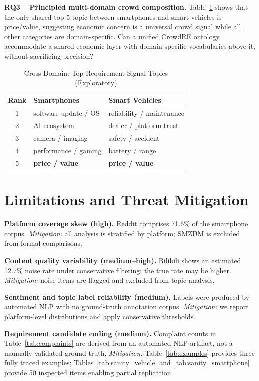 \documentclass[conference]{IEEEtran}
\begin{document}
\textbf{RQ3 -- Principled multi-domain crowd composition.} Table~\ref{tab:crossdomain} shows that the only shared top-5 topic between smartphones and smart vehicles is price/value, suggesting economic concern is a universal crowd signal while all other categories are domain-specific. Can a unified CrowdRE ontology accommodate a shared economic layer with domain-specific vocabularies above it, without sacrificing precision?

\begin{table}[htb]
\caption{Cross-Domain: Top Requirement Signal Topics (Exploratory)}
\label{tab:crossdomain}
\centering\small
\begin{tabular}{cll}
\toprule
Rank & Smartphones & Smart Vehicles \\
\midrule
1 & software update / OS      & reliability / maintenance \\
2 & AI ecosystem              & dealer / platform trust \\
3 & camera / imaging          & safety / accident \\
4 & performance / gaming      & battery / range \\
5 & \textbf{price / value}    & \textbf{price / value} \\
\bottomrule
\end{tabular}
\end{table}

\section{Limitations and Threat Mitigation}
\label{sec:limits}

\textbf{Platform coverage skew (high).} Reddit comprises 71.6\% of the smartphone corpus. \textit{Mitigation:} all analysis is stratified by platform; SMZDM is excluded from formal comparisons.

\textbf{Content quality variability (medium--high).} Bilibili shows an estimated 12.7\% noise rate under conservative filtering; the true rate may be higher. \textit{Mitigation:} noise items are flagged and excluded from topic analysis.

\textbf{Sentiment and topic label reliability (medium).} Labels were produced by automated NLP with no ground-truth annotation corpus. \textit{Mitigation:} we report platform-level distributions and apply conservative thresholds.

\textbf{Requirement candidate coding (medium).} Complaint counts in Table~\ref{tab:complaints} are derived from an automated NLP artifact, not a manually validated ground truth. \textit{Mitigation:} Table~\ref{tab:examples} provides three fully traced examples; Tables~\ref{tab:sanity_vehicle} and~\ref{tab:sanity_smartphone} provide 50 inspected items enabling partial replication.
\end{document}
